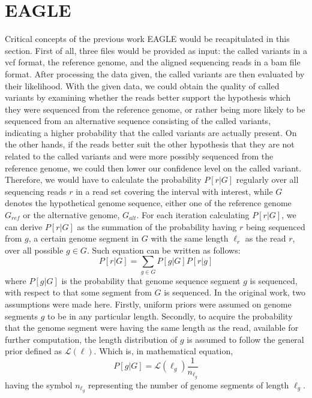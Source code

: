 \documentclass{PHlab-thesis}
\begin{document}
\section{EAGLE}
Critical concepts of the previous work EAGLE would be recapitulated in this section. First of all, three files would be provided as input: the called variants in a vcf format, the reference genome, and the aligned sequencing reads in a bam file format. After processing the data given, the called variants are then evaluated by their likelihood. With the given data, we could obtain the quality of called variants by examining whether the reads better support the hypothesis which they were sequenced from the reference genome, or rather being more likely to be sequenced from an alternative sequence consisting of the called variants, indicating a higher probability that the called variants are actually present. On the other hands, if the reads better suit the other hypothesis that they are not related to the called variants and were more possibly sequenced from the reference genome, we could then lower our confidence level on the called variant. Therefore, we would have to calculate the probability $P[r|G]$ regularly over all sequencing reads $r$ in a read set covering the interval with interest, while $G$ denotes the hypothetical genome sequence, either one of the reference genome $G_{ref}$ or the alternative genome, $G_{alt}$. For each iteration calculating $P[r|G]$, we can derive $P[r|G]$ as the summation of the probability having $r$ being sequenced from $g$, a certain genome segment in $G$ with the same length $\ell_r$ as the read $r$, over all possible ${g\in G}$. Such equation can be written as follows:
\begin{equation}
P[r|G] = \sum_{g\in G} P[g|G] P[r|g]
\end{equation}
where $P[g|G]$ is the probability that genome sequence segment $g$ is sequenced, with respect to that some segment from $G$ is sequenced. In the original work, two assumptions were made here. Firstly, uniform priors were assumed on genome segments $g$ to be in any particular length. Secondly, to acquire the probability that the genome segment were having the same length as the read, available for further computation, the length distribution of $g$ is assumed to follow the general prior defined as $\mathcal{L}(\ell)$. Which is, in mathematical equation,
\begin{equation}
P[g|G] = \mathcal{L}(\ell_g) \frac{1}{n_{\ell_g}}
\end{equation}
having the symbol $n_{\ell_g}$ representing the number of genome segments of length $\ell_g$.
\end{document}

